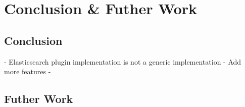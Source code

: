 \chapter{Conclusion \& Futher Work}
\label{ch:conclusion}

\section{Conclusion}
- Elasticsearch plugin implementation is not a generic implementation
- Add more features
- 
\section{Futher Work}
